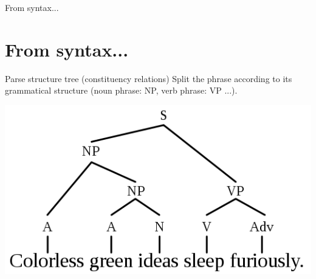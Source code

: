 \documentclass[10pt]{beamer}
\begin{document}

\begin{frame}{From syntax...}

\section{From syntax...}

\begin{block}{Parse structure tree (constituency relations)}
	Split the phrase according to its grammatical structure (noun phrase: NP, verb phrase: VP ...).
	\begin{center}
		\includegraphics[scale=0.30]{522px-Cgisf-tgg.png}
	\end{center}
\end{block}
		
\end{frame}

\end{document}
